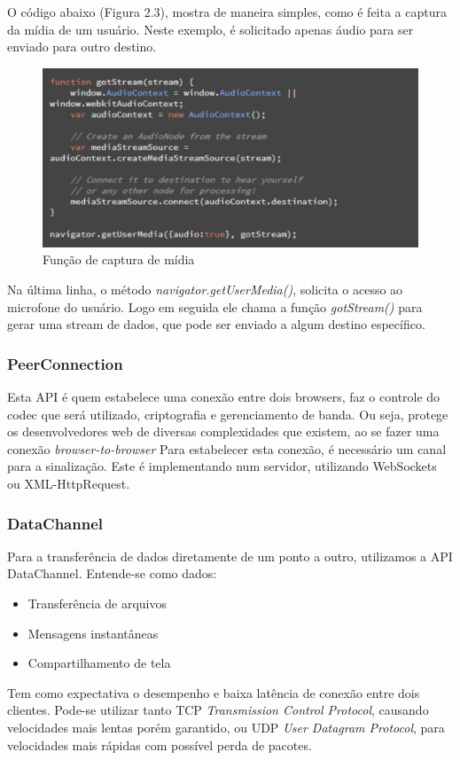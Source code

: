 \documentclass[12pt,a4paper,oneside]{report}
\begin{document}
O código abaixo (Figura 2.3), mostra de maneira simples, como é feita a captura da mídia de um usuário. Neste exemplo, é solicitado apenas áudio para ser enviado para outro destino. 

\begin{figure}[!htdb]
 \centering
  \includegraphics[width = 1\linewidth]{images/mediaStreamCode}
  \caption{Função de captura de mídia} %
  \label{f_mediaStreamCode}
\end{figure}

Na última linha, o método \textit {navigator.getUserMedia()}, solicita o acesso ao microfone do usuário. Logo em seguida ele chama a função \textit {gotStream()} para gerar uma stream de dados, que pode ser enviado a algum destino específico.

\subsubsection{PeerConnection}
\label{sss_peerConnection}
Esta API é quem estabelece uma conexão entre dois browsers, faz o controle do codec que será utilizado, criptografia e gerenciamento de banda. Ou seja, protege os desenvolvedores web de diversas complexidades que existem, ao se fazer uma conexão \textit{browser-to-browser} Para estabelecer esta conexão, é necessário um canal para a sinalização. Este é implementando num servidor, utilizando WebSockets ou XML-HttpRequest.

\subsubsection{DataChannel}
\label{sss_dataChannel}
Para a transferência de dados diretamente de um ponto a outro, utilizamos a API DataChannel. Entende-se como dados: 
\begin{itemize}
  \item Transferência de arquivos
  \item Mensagens instantâneas
  \item Compartilhamento de tela
\end{itemize}
Tem como expectativa o desempenho e baixa latência de conexão entre dois clientes. Pode-se utilizar tanto TCP \textit{Transmission Control Protocol}, causando velocidades mais lentas porém garantido, ou UDP \textit {User Datagram Protocol}, para velocidades mais rápidas com possível perda de pacotes.
\end{document}
